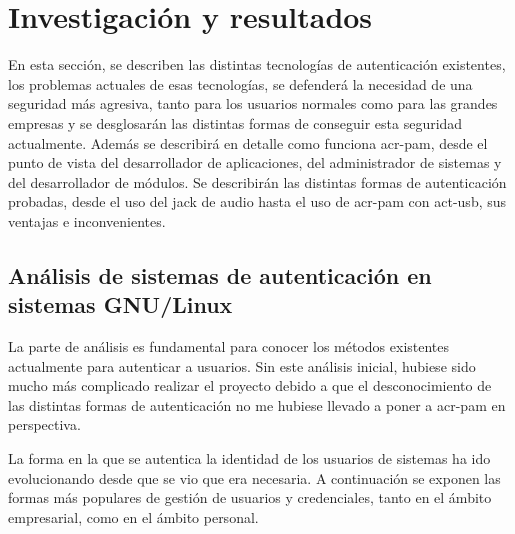\documentclass[titlepage, 12pt, a4paper]{article}
\begin{document}
\section{Investigación y resultados}
En esta sección, se describen las distintas tecnologías de autenticación existentes, los problemas actuales de esas tecnologías, se defenderá la necesidad de una seguridad más agresiva, tanto para los usuarios normales como para las grandes empresas y se desglosarán las distintas formas de conseguir esta seguridad actualmente. Además se describirá en detalle como funciona \gls{acr-pam}, desde el punto de vista del desarrollador de aplicaciones, del administrador de sistemas y del desarrollador de módulos. Se describirán las distintas formas de autenticación probadas, desde el uso del jack de audio hasta el uso de \gls{acr-pam} con \gls{act-usb}, sus ventajas e inconvenientes.
\subsection{Análisis de sistemas de autenticación en sistemas \gls{GNU/Linux}}
La parte de análisis es fundamental para conocer los métodos existentes actualmente para autenticar a usuarios. Sin este análisis inicial, hubiese sido mucho más complicado realizar el proyecto debido a que el desconocimiento de las distintas formas de autenticación no me hubiese llevado a poner a \gls{acr-pam} en perspectiva. \par
La forma en la que se autentica la identidad de los usuarios de sistemas ha ido evolucionando desde que se vio que era necesaria. A continuación se exponen las formas más populares de gestión de usuarios y credenciales, tanto en el ámbito empresarial, como en el ámbito personal.
\end{document}
